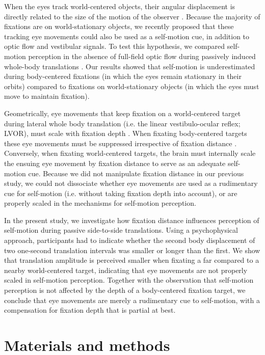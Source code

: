 When the eyes track world-centered objects, their angular displacement is directly related to the size of the motion of the observer \cite{schwarz1989, paige1998, mchenry2000, medendorp2002}. Because  the majority of fixations are on world-stationary  objects, we recently proposed that these tracking eye movements could also be used as a self-motion cue, in addition to optic flow and vestibular signals. To test this hypothesis, we compared self-motion perception in the absence of full-field optic flow during passively induced whole-body translations \cite{clemens2015a}. Our results showed that self-motion is underestimated during body-centered fixations (in which the eyes remain stationary in their orbits) compared to fixations on world-stationary objects (in which the eyes must move to maintain fixation).

Geometrically, eye movements that keep fixation on a world-centered target during lateral whole body translation (i.e. the linear vestibulo-ocular reflex; LVOR), must scale with fixation depth \cite{angelaki2004}. When fixating body-centered targets these eye movements must be suppressed irrespective of fixation distance \cite{angelaki2004}. Conversely, when fixating world-centered targets, the brain must internally scale the ensuing eye movement by fixation distance to serve as an adequate self-motion cue. Because we did not manipulate fixation distance in our previous study, we could not dissociate whether eye movements are used as a rudimentary cue for self-motion (i.e. without taking fixation depth into account), or are properly scaled in the mechanisms for self-motion perception.

In the present study, we investigate how fixation distance influences perception of self-motion during passive side-to-side translations. Using a psychophysical approach, participants had to indicate whether the second body displacement of two one-second translation intervals was smaller or longer than the first. We show that translation amplitude is perceived smaller when fixating a far compared to a nearby world-centered target, indicating that eye movements are not properly scaled in self-motion perception. Together with the observation that self-motion perception is not affected by the depth of a body-centered fixation target, we conclude that eye movements are merely a rudimentary cue to self-motion, with a compensation for fixation depth that is partial at best.




\section{Materials and methods}
\label{p4:sec:methods}

